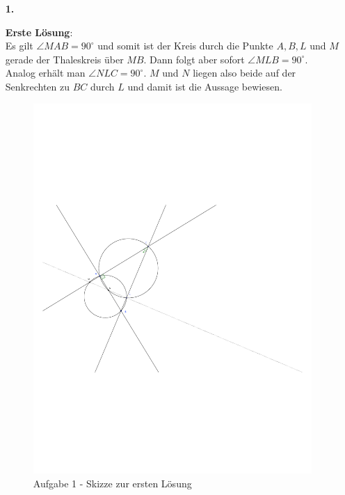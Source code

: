 \documentclass[12pt,a4paper]{article}
\theoremstyle{plain}
\theoremstyle{definition}
\theoremstyle{remark}
\begin{document}
\begin{enumerate}

\item[\textbf{1.}] 

\textbf{Erste Lösung}:\\
Es gilt $\angle MAB=90^\circ$ und somit ist der Kreis durch die Punkte $A, B, L$ und $M$ gerade der Thaleskreis über $MB$. Dann folgt aber sofort $\angle MLB=90^\circ$.
Analog erhält man $\angle NLC=90^\circ$. $M$ und $N$ liegen also beide auf der Senkrechten zu $BC$ durch $L$ und damit ist die Aussage bewiesen. \\

\begin{figure}[h]
\begin{center}
\includegraphics[width=13cm]{aufgabe1.pdf}
\caption{Aufgabe 1 - Skizze zur ersten Lösung}
\end{center}
\end{figure}


\end{enumerate}
\end{document}
